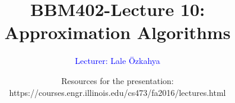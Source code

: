 \documentclass[xcolor=dvipsnames,smaller]{beamer}
\title[BBM402-Lecture 10: Approximation Algorithms]
{BBM402-Lecture 10: Approximation Algorithms}
\author{
\vspace{2cm}
\textcolor{Blue}{\large{Lecturer: Lale \"Ozkahya}}}
\date{
\footnotesize{
Resources for the presentation:\\
https://courses.engr.illinois.edu/cs473/fa2016/lectures.html}}
\begin{document}
\newtheorem{thm}[theorem] {Theorem}
\newtheorem{lem}[theorem]{Lemma}
\newtheorem{cor}[theorem]{Corollary}
\newtheorem{prp}[theorem]{Proposition}
\newtheorem{clm}[theorem]{Claim}
\newtheorem{conj}[theorem]{Conjecture}
\newtheorem{remark}[theorem]{Remark}
\newtheorem{construction}[theorem]{Construction}

\def\EE{\mathcal{E}}


\def\tr{\textcolor{Red}}
\def\tb{\textcolor{Blue}}
\def\vs{\vspace{0.5cm}}

\begin{frame}
\titlepage
\end{frame}

\normalsize{




}
\end{document}
